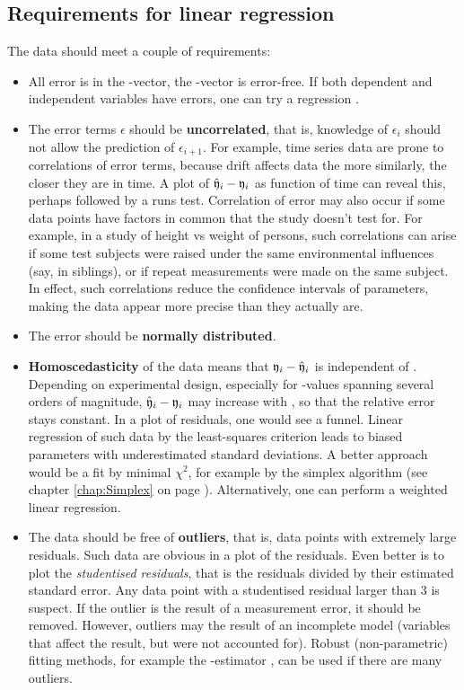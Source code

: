 \begin{refsection}
\subsection{Requirements for linear regression}

The data  should meet a couple of requirements:
\begin{itemize}
  \item{All error is in the -vector, the -vector is error-free. If both dependent and independent variables have errors, one can try a  regression \parencite{Dem-43}.}
  \item{The error terms \(\epsilon \) should be \textbf{uncorrelated}, that is, knowledge of \(\epsilon_i \) should not allow the prediction of \(\epsilon_{i+1} \). For example, time series data are prone to correlations of error terms, because drift affects data the more similarly, the closer they are in time. A plot of \(\hat{\mathfrak{y}}_i - \mathfrak{y}_i \) as function of time can reveal this, perhaps followed by a runs test. Correlation of error may also occur if some data points have factors in common that the study doesn't test for. For example, in a study of height vs weight of persons, such correlations can arise if some test subjects were raised under the same environmental influences (say, in siblings), or if repeat measurements were made on the same subject. In effect, such correlations reduce the confidence intervals of parameters, making the data appear more precise than they actually are.}
  \item{The error should be \textbf{normally distributed}.}
  \item{\textbf{Homoscedasticity} of the data means that \(\mathfrak{y}_i - \hat{\mathfrak{y}}_i\) is independent of . Depending on experimental design, especially for -values spanning several orders of magnitude, \(\hat{\mathfrak{y}}_i - \mathfrak{y}_i \) may increase with , so that the relative error stays constant. In a plot of residuals, one would see a funnel. Linear regression of such data by the least-squares criterion leads to biased parameters with underestimated standard deviations. A better approach would be a fit by minimal \(\chi^2 \), for example by the simplex algorithm (see chapter \ref{chap:Simplex} on page \pageref{chap:Simplex}). Alternatively, one can perform a weighted linear regression. }
  \item{The data should be free of \textbf{outliers}, that is, data points with extremely large residuals. Such data are obvious in a plot of the residuals. Even better is to plot the \emph{studentised residuals}, that is the residuals divided by their estimated standard error. Any data point with a studentised residual larger than \num{3} is suspect. If the outlier is the result of a measurement error, it should be removed. However, outliers may the result of an incomplete model (variables that affect the result, but were not accounted for). Robust (non-parametric) fitting methods, for example the -estimator \parencite{The-50}, can be used if there are many outliers.  }

\end{itemize}
\end{refsection}
